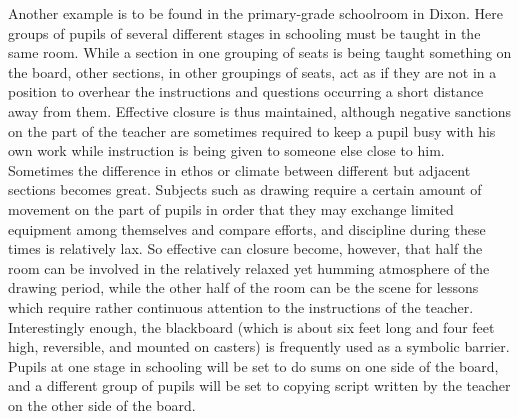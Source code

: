 \documentclass[openany,nobib]{tufte-book}
\begin{document}
Another example is to be found in the primary-grade schoolroom in Dixon.
Here groups of pupils of several different stages in schooling must be
taught in the same room. While a section in one grouping of seats is
being taught something on the board, other sections, in other groupings
of seats, act as if they are not in a position to overhear the
instructions and questions occurring a short distance away from them.
Effective closure is thus maintained, although negative sanctions on the
part of the teacher are sometimes required to keep a pupil busy with his
own work while instruction is being given to someone else close to him.
Sometimes the difference in ethos or climate between different but
adjacent sections becomes great. Subjects such as drawing require a
certain amount of movement on the part of pupils in order that they may
exchange limited equipment among themselves and compare efforts, and
discipline during these times is relatively lax. So effective can
closure become, however, that half the room can be involved in the
relatively relaxed yet humming atmosphere of the drawing period, while
the other half of the room can be the scene for lessons which require
rather continuous attention to the instructions of the teacher.
Interestingly enough, the blackboard (which is about six feet long and
four feet high, reversible, and mounted on casters) is frequently used
as a symbolic barrier. Pupils at one stage in schooling will be set to
do sums on one side of the board, and a different group of pupils will
be set to copying script written by the teacher on the other side of the
board.
\end{document}
